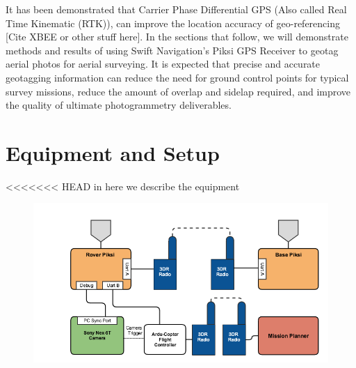 \documentclass{article}
\begin{document}
It has been demonstrated that Carrier Phase Differential GPS (Also called Real Time Kinematic (RTK)), can improve the location accuracy of geo-referencing [Cite XBEE or other stuff here].  In the sections that follow, we will demonstrate methods and results of using Swift Navigation's Piksi GPS Receiver to geotag aerial photos for aerial surveying.  It is expected that precise and accurate geotagging information can reduce the need for ground control points for typical survey missions, reduce the amount of overlap and sidelap required, and improve the quality of ultimate photogrammetry deliverables.

\section{Equipment and Setup}
<<<<<<< HEAD
\label{sec:equipment}in
here we describe the equipment
\begin{figure}[h]
\includegraphics[width=7in]{images/flow_charts/uav_piksi_flow_chart.png}
\end{figure}

\end{document}
